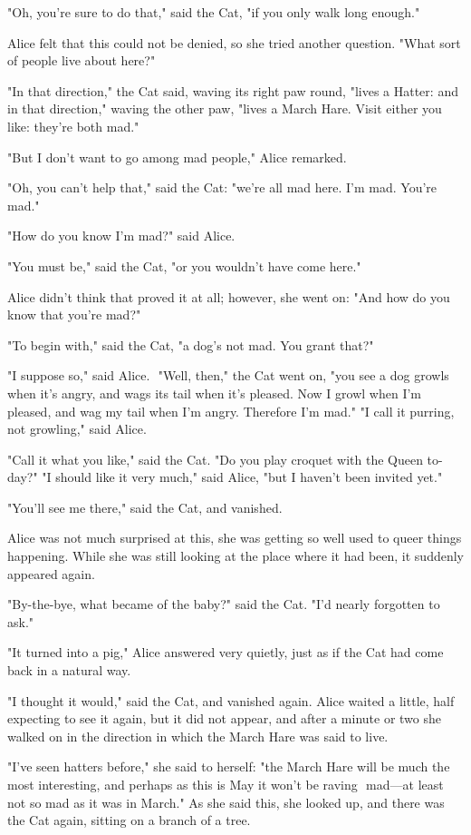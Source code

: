 ​"Oh, you're sure to do that," said the Cat, "if you only walk long enough."

Alice felt that this could not be denied, so she tried another question. "What sort of people live about here?"

"In that direction," the Cat said, waving its right paw round, "lives a Hatter: and in that direction," waving the other paw, "lives a March Hare. Visit either you like: they're both mad."

"But I don't want to go among mad people," Alice remarked.

"Oh, you can't help that," said the Cat: "we're all mad here. I'm mad. You're mad."

"How do you know I'm mad?" said Alice.

"You must be," said the Cat, "or you wouldn't have come here."

Alice didn't think that proved it at all; however, she went on: "And how do you know that you're mad?"

"To begin with," said the Cat, "a dog's not mad. You grant that?"

"I suppose so," said Alice.
​
"Well, then," the Cat went on, "you see a dog growls when it's angry, and wags its tail when it's pleased. Now I growl when I'm pleased, and wag my tail when I'm angry. Therefore I'm mad."
"I call it purring, not growling," said Alice.

"Call it what you like," said the Cat. "Do you play croquet with the Queen to-day?"
​"I should like it very much," said Alice, "but I haven't been invited yet."

"You'll see me there," said the Cat, and vanished.

Alice was not much surprised at this, she was getting so well used to queer things happening. While she was still looking at the place where it had been, it suddenly appeared again.

"By-the-bye, what became of the baby?" said the Cat. "I'd nearly forgotten to ask."

"It turned into a pig," Alice answered very quietly, just as if the Cat had come back in a natural way.

"I thought it would," said the Cat, and vanished again. Alice waited a little, half expecting to see it again, but it did not appear, and after a minute or two she walked on in the direction in which the March Hare was said to live.

"I've seen hatters before," she said to herself: "the March Hare will be much the most interesting, and perhaps as this is May it won't be raving ​
mad—at least not so mad as it was in March." As she said this, she looked up, and there was the Cat again, sitting on a branch of a tree.

